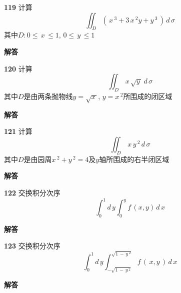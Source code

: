 \documentclass[a4paper,10pt]{article} %
\begin{document}


\textheight


\par\noindent \textbf{119} \quad 计算
$$ \iint_D \left(\,x\,^3+3\,x\,^2y+y\,^3\,\right)\,d\,\sigma$$
其中$D: 0\leq \,x\,\leq 1$, $0\leq \,y\,\leq 1$
\par\noindent \textbf{ 解答}





\textheight


\par\noindent \textbf{120} \quad 计算
$$ \iint_D \,x\,\sqrt{y\,}\,d\,\sigma$$
其中$D$是由两条抛物线$y=\sqrt{x\,}$, $y=x\,^2$所围成的闭区域
\par\noindent \textbf{ 解答}







\textheight


\par\noindent \textbf{121} \quad 计算
$$ \iint_D \,x\,y\,^2\,d\,\sigma$$
其中$D$是由园周$x\,^2+y\,^2=4$及$y$轴所围成的右半闭区域
\par\noindent \textbf{ 解答}




\textheight


\par\noindent \textbf{122} \quad 交换积分次序
$$ \int_0^1 d\,y\int_0^y f\,(x,y)\,d\,x$$
\par\noindent \textbf{ 解答}




\textheight


\par\noindent \textbf{123} \quad 交换积分次序
$$ \int_0^1 d\,y\int_{-\sqrt{1\,-\,y\,^2}}^{\sqrt{1\,-\,y\,^2}} f\,(\,x,y\,)\,d\,x$$
\par\noindent \textbf{ 解答}
\end{document}
